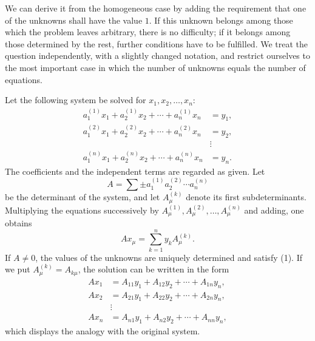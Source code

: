 \documentclass[11pt]{article}
\begin{document}
We can derive it from the homogeneous case by adding the requirement that one of the unknowns shall have the value \(1\).  If this unknown belongs among those which the problem leaves arbitrary, there is no difficulty; if it belongs among those determined by the rest, further conditions have to be fulfilled.  We treat the question independently, with a slightly changed notation, and restrict ourselves to the most important case in which the number of unknowns equals the number of equations.

Let the following system be solved for \(x_1,x_2,\ldots,x_n\):
\begin{equation}
\begin{aligned}
 a_1^{(1)}x_1+a_2^{(1)}x_2+\cdots+a_n^{(1)}x_n&=y_1,\\
 a_1^{(2)}x_1+a_2^{(2)}x_2+\cdots+a_n^{(2)}x_n&=y_2,\\
 &\vdots\\
 a_1^{(n)}x_1+a_2^{(n)}x_2+\cdots+a_n^{(n)}x_n&=y_n.
\end{aligned}
\tag{1}
\end{equation}
The coefficients and the independent terms are regarded as given.  Let
\begin{equation}
        A=\sum\pm a_1^{(1)}a_2^{(2)}\cdots a_n^{(n)}
\tag{2}
\end{equation}
be the determinant of the system, and let \(A_\mu^{(k)}\) denote its first subdeterminants.  Multiplying the equations successively by \(A_\mu^{(1)},A_\mu^{(2)},\ldots,A_\mu^{(n)}\) and adding, one obtains
\begin{equation}
        A x_\mu=\sum_{k=1}^{n} y_k A_\mu^{(k)}.
\tag{4}
\end{equation}
If \(A\ne0\), the values of the unknowns are uniquely determined and satisfy (1).  If we put \(A_\mu^{(k)}=A_{k\mu}\), the solution can be written in the form
\begin{equation}
\begin{aligned}
 A x_1&=A_{11}y_1+A_{12}y_2+\cdots+A_{1n}y_n,\\
 A x_2&=A_{21}y_1+A_{22}y_2+\cdots+A_{2n}y_n,\\
 &\vdots\\
 A x_n&=A_{n1}y_1+A_{n2}y_2+\cdots+A_{nn}y_n,
\end{aligned}
\tag{5}
\end{equation}
which displays the analogy with the original system.
\end{document}
